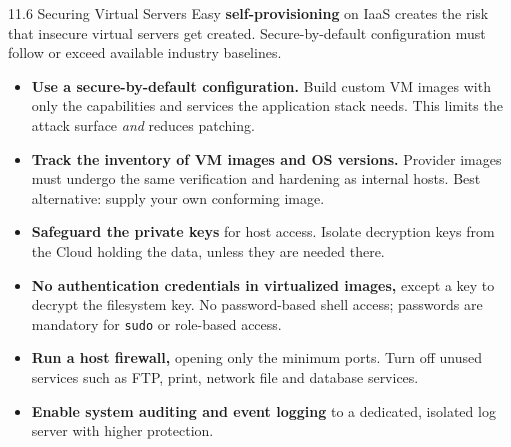 \documentclass[11pt,aspectratio=169]{beamer}
\newcommand{\kw}[1]{\textbf{\color{accent}#1}}
\begin{document}
\begin{frame}{11.6 Securing Virtual Servers}
  \small
  Easy \kw{self-provisioning} on IaaS creates the risk that insecure virtual
  servers get created. Secure-by-default configuration must follow or exceed
  available industry baselines.
  \vspace{0.6em}

  \begin{itemize}\scriptsize\setlength{\itemsep}{0.42em}
    \item \kw{Use a secure-by-default configuration.} Build custom VM images
          with only the capabilities and services the application stack needs.
          This limits the attack surface \emph{and} reduces patching.
    \item \kw{Track the inventory of VM images and OS versions.} Provider
          images must undergo the same verification and hardening as internal
          hosts. Best alternative: supply your own conforming image.
    \item \kw{Safeguard the private keys} for host access. Isolate decryption
          keys from the Cloud holding the data, unless they are needed there.
    \item \kw{No authentication credentials in virtualized images,} except a
          key to decrypt the filesystem key. No password-based shell access;
          passwords are mandatory for \texttt{sudo} or role-based access.
    \item \kw{Run a host firewall,} opening only the minimum ports. Turn off
          unused services such as FTP, print, network file and database
          services.
    \item \kw{Enable system auditing and event logging} to a dedicated,
          isolated log server with higher protection.
  \end{itemize}
\end{frame}
\end{document}
